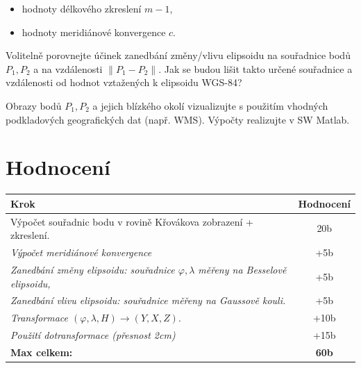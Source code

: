 \begin{itemize}
    \item hodnoty délkového zkreslení $m - 1$,
    \item hodnoty meridiánové konvergence $c$.
\end{itemize}

Volitelně porovnejte účinek zanedbání změny/vlivu elipsoidu na souřadnice bodů $P_1, P_2$ a na vzdálenosti $\|P_1 - P_2\|$. Jak se budou lišit takto určené souřadnice a vzdálenosti od hodnot vztažených k elipsoidu WGS-84?

Obrazy bodů $P_1, P_2$ a jejich blízkého okolí vizualizujte s použitím vhodných podkladových geografických dat (např. WMS). Výpočty realizujte v SW Matlab.

\section*{Hodnocení}

\begin{table}[b]
\centering
\begin{tabular}{|l|c|}
\hline
\textbf{Krok} & \textbf{Hodnocení} \\
\hline
Výpočet souřadnic bodu v rovině Křovákova zobrazení + zkreslení. \cellcolor{green} & 20b \cellcolor{green} \\
\hline
\textit{Výpočet meridiánové konvergence} \cellcolor{green} & +5b \cellcolor{green} \\
\hline
\textit{Zanedbání změny elipsoidu: souřadnice $\varphi, \lambda$ měřeny na Besselově elipsoidu,} & +5b \\
\hline
\textit{Zanedbání vlivu elipsoidu: souřadnice měřeny na Gaussově kouli.} & +5b \\
\hline
\textit{Transformace $(\varphi, \lambda, H) \rightarrow (Y, X, Z).$} \cellcolor{green} & +10b \cellcolor{green}\\
\hline
\textit{Použití dotransformace (přesnost 2cm)} & +15b \\
\hline
\textbf{Max celkem:} & \textbf{60b} \\
\hline
\end{tabular}
\end{table}


